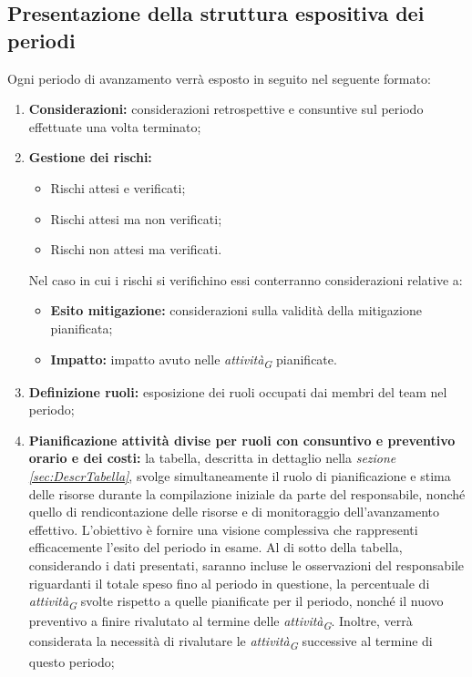 \subsection{Presentazione della struttura espositiva dei periodi}
Ogni periodo di avanzamento verrà esposto in seguito nel seguente formato:
\begin{enumerate}
    \item \textbf{Considerazioni:} considerazioni retrospettive e consuntive sul periodo effettuate una volta terminato;

    \pagebreak
    
    \item \textbf{Gestione dei rischi:}
            \begin{itemize}
                \item Rischi attesi e verificati;
                \item Rischi attesi ma non verificati;
                \item Rischi non attesi ma verificati.
            \end{itemize}
        Nel caso in cui i rischi si verifichino essi conterranno considerazioni relative a:
        \begin{itemize}
            \item \textbf{Esito mitigazione:} considerazioni sulla validità della mitigazione pianificata;
            \item \textbf{Impatto:} impatto avuto nelle \textit{attività}\textsubscript{\textit{G}} pianificate.
        \end{itemize}
    \item \textbf{Definizione ruoli:} esposizione dei ruoli occupati dai membri del team nel periodo;
    \item \textbf{Pianificazione attività divise per ruoli con consuntivo e preventivo orario e dei costi:}
    la tabella, descritta in dettaglio nella \textit{sezione \ref{sec:DescrTabella}}, svolge simultaneamente il ruolo di pianificazione e stima delle risorse durante la compilazione iniziale da parte del responsabile, nonché quello di rendicontazione delle risorse e di monitoraggio dell'avanzamento effettivo. L'obiettivo è fornire una visione complessiva che rappresenti efficacemente l'esito del periodo in esame.
    Al di sotto della tabella, considerando i dati presentati, saranno incluse le osservazioni del responsabile riguardanti il totale speso fino al periodo in questione, la percentuale di \textit{attività}\textsubscript{\textit{G}} svolte rispetto a quelle pianificate per il periodo, nonché il nuovo preventivo a finire rivalutato al termine delle \textit{attività}\textsubscript{\textit{G}}. Inoltre, verrà considerata la necessità di rivalutare le \textit{attività}\textsubscript{\textit{G}} successive al termine di questo periodo;

\end{enumerate}
